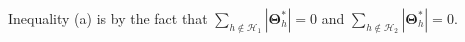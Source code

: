 \documentclass[12pt,letter]{article}\usepackage[]{graphicx}\usepackage[]{color}
\newcommand{\bTheta}{\boldsymbol{\Theta}}
\newcommand{\btheta}{\boldsymbol{\theta}}
\newcommand{\bThetastar}{\boldsymbol{\Theta}^{*}}
\newcommand{\bdelta}{\boldsymbol{\delta}}
\newcommand{\A}{\mathcal{A}}
\begin{document}
\begin{comment}
\begin{align*}
D_{n}(\bdelta) & =-L_{n}(\bThetastar+\eta_{n}\bdelta)+L_{n}(\bThetastar)+ n\sum_{h=1}^{p+1} \left( \lambda_{h}^{\beta}\left|\beta_{h}+\right| \cdot \textrm{I}_{\lbrace h=1 \rbrace} +   \lambda_{h}^{\theta}\left\Vert \btheta_{h}\right\Vert _{2}\right) + 
n\lambda_{E}(|\beta_{E}^{*}+\eta_{n}u_{E}|-|\beta_{E}^{*}|)+n\sum_{j}\lambda_{j}^{\theta}\left(\left\Vert \btheta{}_{j}^{*}+\eta_{n}\boldsymbol{u}_{j}\right\Vert _{2}-\left\Vert \btheta_{j}^{*}\right\Vert _{2}\right)\\
& +n\sum_{k}\lambda_{k}^{\gamma}(|\gamma_{k}^{*}+\eta_{n}v_{kE}|-|\gamma_{k}^{*}|)\\
& \overset{(a)}{\geq}-L_{n}(\bThetastar+\eta_{n}\bdelta)+L_{n}(\bThetastar)+n\lambda_{E}(|\beta_{E}^{*}+\eta_{n}u_{E}|-|\beta_{E}^{*}|)\cdot I(\beta_{E}^{*}\neq0)\\ 
&+n\sum_{j\in\mathcal{A}_{2}}\lambda_{j}^{\theta}\left(\left\Vert \btheta{}_{j}^{*}+\eta_{n}\boldsymbol{u}_{j}\right\Vert _{2}-\left\Vert \btheta_{j}^{*}\right\Vert _{2}\right)\\
& +n\sum_{k\in\mathcal{A}_{3}}\lambda_{k}^{\gamma}(|\gamma_{k}^{*}+\eta_{n}v_{kE}|-|\gamma_{k}^{*}|)\\
& \overset{(b)}{\geq}-L_{n}(\bThetastar+\eta_{n}\bdelta)+L_{n}(\bThetastar)-n\eta_{n}\lambda_{E}|u_{E}|\cdot I(\beta_{E}^{*}\neq0)-n\eta_{n}\sum_{j\in\A_{2}}\lambda_{j}^{\theta}\left\Vert \boldsymbol{u}_{j}\right\Vert _{2}-n\eta_{n}\sum_{k\in\A_{3}}\lambda_{k}^{\gamma}|v_{kE}|\\
& \overset{(c)}{\geq}-L_{n}(\bThetastar+\eta_{n}\bdelta)+L_{n}(\bThetastar)-n\eta_{n}^{2}\left(\left|u_{E}\right|\cdot I(\beta_{E}^{*}\neq0)+\sum_{j\in\A_{2}}\left\Vert \boldsymbol{u}_{j}\right\Vert _{2}+\sum_{k\in\A_{3}}\lambda_{k}^{\gamma}|v_{kE}|\right)\\
& \overset{(d)}{\geq}-L_{n}(\bThetastar+\eta_{n}\bdelta)+L_{n}(\bThetastar)-n\eta_{n}^{2}\left(|\A_{1}|+|\A_{2}|+|\A_{3}|\right)d\\
& \overset{(e)}{=}-[\nabla L_{n}(\bThetastar)]^{\top}(\eta_{n}\bdelta)-\frac{1}{2}(\eta_{n}\bdelta)^{\top}[\nabla^{2}L_{n}(\bThetastar)](\eta_{n}\bdelta)(1+o_{p}(1))\\
& -n\eta_{n}^{2}\left(|\A_{1}|+|\A_{2}|+|\A_{2}|\right)d
\end{align*}
\end{comment}
Inequality (a) is by the fact that $\sum_{h\notin\mathcal{H}_1}|\bTheta_{h}^{*}|=0$ and $\sum_{h\notin\mathcal{H}_2}|\bTheta_{h}^{*}|=0$. 
\end{document}

